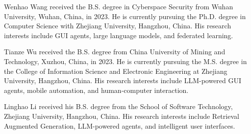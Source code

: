 \vspace{-3em}

\begin{IEEEbiography}{Wenhao Wang}
received the B.S. degree in Cyberspace Security from Wuhan University, Wuhan, China, in 2023. He is currently pursuing the Ph.D. degree in Computer Science with Zhejiang University, Hangzhou, China. His research interests include GUI agents, large language models, and federated learning.
\end{IEEEbiography}

\vspace{-3em}

\begin{IEEEbiography}{Tianze Wu}
received the B.S. degree from China University of Mining and Technology, Xuzhou, China, in 2023. He is currently pursuing the M.S. degree in the College of Information Science and Electronic Engineering at Zhejiang University, Hangzhou, China. His research interests include LLM-powered GUI agents, mobile automation, and human-computer interaction.
\end{IEEEbiography}

\vspace{-3em}

\begin{IEEEbiography}{Linghao Li}
received his B.S. degree from the School of Software Technology, Zhejiang University, Hangzhou, China. His research interests include Retrieval Augmented Generation, LLM-powered agents, and intelligent user interfaces.
\end{IEEEbiography}

